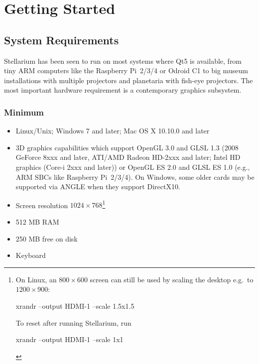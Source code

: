 

\chapter{Getting Started}
\label{ch:GettingStarted}

\section{System Requirements}
\label{sec:GettingStarted:SystemRequirements}

Stellarium has been seen to run on most systems where Qt5 is
available, from tiny ARM computers like the Raspberry Pi~2/3/4
or Odroid C1 to big museum installations with multiple projectors 
and planetaria with fish-eye projectors. 
The most important hardware requirement is a contemporary graphics subsystem.


\subsection{Minimum}
\begin{itemize}
\item Linux/Unix; Windows 7 and later; Mac OS X 10.10.0 and later
\item 3D graphics capabilities which support OpenGL 3.0 and GLSL 1.3 (2008
  GeForce 8xxx and later, ATI/AMD Radeon HD-2xxx and later; Intel HD
  graphics (Core-i 2xxx and later)) or OpenGL ES 2.0 and GLSL ES 1.0
  (e.g., ARM SBCs like Raspberry Pi~2/3/4). On Windows, some older cards
  may be supported via ANGLE when they support DirectX10.
\item Screen resolution $1024\times768$\footnote{On Linux, an $800\times600$ screen can still be used by scaling the desktop e.g.\ to $1200\times900$:
  \begin{commands}
    xrandr --output HDMI-1 --scale 1.5x1.5
  \end{commands}
  To reset after running Stellarium, run
  \begin{commands}
    xrandr --output HDMI-1 --scale 1x1
  \end{commands}}
\item 512 MB RAM
\item 250 MB free on disk
\item Keyboard
\end{itemize}

